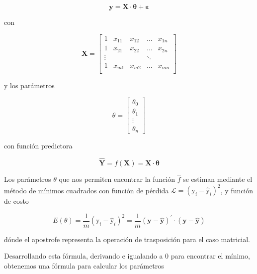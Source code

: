         \begin{equation}
            \mathbf{y} = \mathbf{X}\cdot\mathbf{\theta} + \mathbf{\varepsilon}\label{eq:3}
        \end{equation}
        
        \noindent con
        
        $$\mathbf{X} = \begin{bmatrix}
                        1 & x_{11} & x_{12} & \dots & x_{1n}\\
                        1 & x_{21} & x_{22} & \dots & x_{2n}\\
                        \vdots & & & \ddots & \\
                        1 & x_{m1} & x_{m2} & \dots & x_{mn}\\
                        \end{bmatrix}$$
        
        \noindent y los parámetros
        
        $$\theta = \begin{bmatrix}
                    \theta_0\\
                    \theta_1\\
                    \vdots\\
                    \theta_n
                    \end{bmatrix}$$
                    
        \noindent con función predictora
        
        \begin{equation}
            \mathbf{\hat{Y}} = f(\mathbf{X}) = \mathbf{X}\cdot\mathbf{\theta}
        \end{equation}
        
        Los parámetros $\theta$ que nos permiten encontrar la función $\hat{f}$ se estiman mediante el método de mínimos cuadrados con función de pérdida $\mathcal{L} =  (\mathrm{y}_i - \mathrm{\hat{y}}_i)^2$, y función de costo
        
        \begin{equation}
            E(\theta) = \frac{1}{m} (\mathrm{y}_i - \mathrm{\hat{y}}_i)^2 = \frac{1}{m} (\mathbf{y} - \mathbf{\hat{y}})^\prime\cdot (\mathbf{y} - \mathbf{\hat{y}})
        \end{equation}
        
        \noindent dónde el apostrofe representa la operación de trasposición para el caso matricial.
        
        Desarrollando esta fórmula, derivando e igualando a 0 para encontrar el mínimo, obtenemos una fórmula para calcular los parámetros
        
